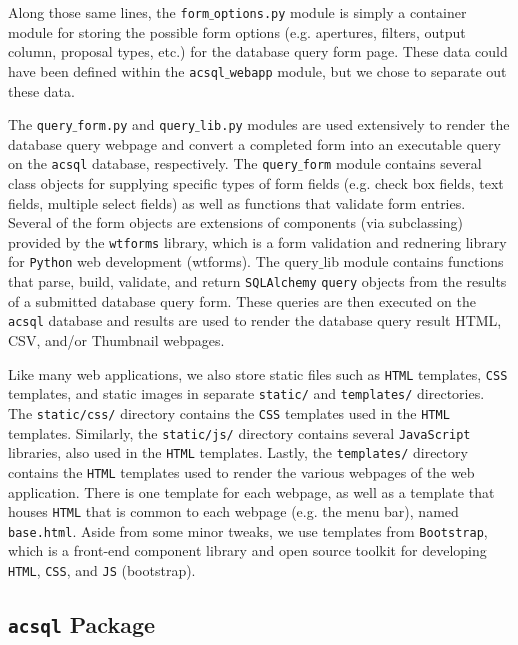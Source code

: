 \documentclass[10pt,journal,compsoc]{IEEEtran}
\begin{document}
Along those same lines, the \texttt{form$\_$options.py} module is simply a container module for storing
the possible form options (e.g. apertures, filters, output column, proposal types, etc.) for the database query
form page.  These data could have been defined within the \texttt{acsql$\_$webapp} module, but we chose to
separate out these data.

The \texttt{query$\_$form.py} and \texttt{query$\_$lib.py} modules are used extensively to render the
database query webpage and convert a completed form into an executable query on the \texttt{acsql} database,
respectively.  The \texttt{query$\_$form} module contains several class objects for supplying specific types
of form fields (e.g. check box fields, text fields, multiple select fields) as well as functions that validate
form entries.  Several of the form objects are extensions of components (via subclassing) provided by the
\texttt{wtforms} library, which is a form validation and rednering library for \texttt{Python} web development
(wtforms).  The {query$\_$lib} module contains functions that parse, build, validate, and return \texttt{SQLAlchemy}
\texttt{query} objects from the results of a submitted database query form.  These queries are then executed
on the \texttt{acsql} database and results are used to render the database query result HTML, CSV, and/or Thumbnail
webpages.

Like many web applications, we also store static files such as \texttt{HTML} templates, \texttt{CSS} templates, and static
images in separate \texttt{static/} and \texttt{templates/} directories.  The \texttt{static/css/} directory
contains the \texttt{CSS} templates used in the \texttt{HTML} templates.  Similarly, the \texttt{static/js/} directory
contains several \texttt{JavaScript} libraries, also used in the \texttt{HTML} templates. Lastly, the \texttt{templates/}
directory contains the \texttt{HTML} templates used to render the various webpages of the web application.  There is one
template for each webpage, as well as a template that houses \texttt{HTML} that is common to each webpage (e.g. the
menu bar), named \texttt{base.html}. Aside from some minor tweaks, we use templates from \texttt{Bootstrap}, which is a
front-end component library and open source toolkit for developing \texttt{HTML}, \texttt{CSS}, and \texttt{JS} (bootstrap).


\subsection{\texttt{acsql} Package}
\end{document}
